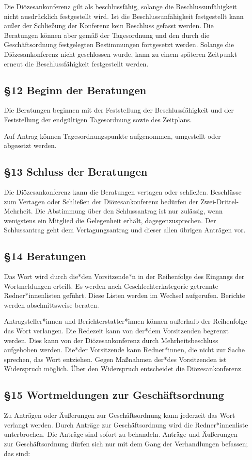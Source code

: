 \documentclass[12pt]{report}
\begin{document}
\begin{justify}
Die Diözesankonferenz gilt als beschlussfähig, solange die Beschlussunfähigkeit nicht ausdrücklich
festgestellt wird. Ist die Beschlussunfähigkeit festgestellt kann außer
der Schließung der Konferenz kein Beschluss gefasst werden. Die Beratungen können aber gemäß der Tagesordnung und den durch die Geschäftsordnung festgelegten Bestimmungen fortgesetzt werden. Solange die Diözesankonferenz nicht geschlossen wurde, kann zu einem späteren Zeitpunkt erneut die Beschlussfähigkeit festgestellt werden.

\subsection*{§12 Beginn der Beratungen}
Die Beratungen beginnen mit der Feststellung der Beschlussfähigkeit und der Feststellung der endgültigen
Tagesordnung sowie des Zeitplans.

Auf Antrag können Tagesordnungspunkte aufgenommen, umgestellt oder abgesetzt werden.
\subsection*{§13 Schluss der Beratungen}
Die Diözesankonferenz kann die Beratungen vertagen oder schließen. Beschlüsse zum Vertagen oder Schließen
der Diözesankonferenz bedürfen der Zwei-Drittel-Mehrheit. Die Abstimmung über den Schlussantrag ist
nur zulässig, wenn wenigstens ein Mitglied die Gelegenheit erhält, dagegenzusprechen. Der Schlussantrag
geht dem Vertagungsantrag und dieser allen übrigen Anträgen vor.
\subsection*{§14 Beratungen}
Das Wort wird durch die*den Vorsitzende*n in der Reihenfolge des Eingangs der Wortmeldungen erteilt.
Es werden nach Geschlechterkategorie getrennte Redner*innenlisten geführt. Diese Listen werden im Wechsel aufgerufen.
Berichte werden abschnittsweise beraten.

Antragsteller*innen und Berichterstatter*innen können außerhalb der Reihenfolge das Wort verlangen. Die Redezeit
kann von der*dem Vorsitzenden begrenzt werden. Dies kann von der Diözesankonferenz durch Mehrheitsbeschluss
aufgehoben werden. Die*der Vorsitzende kann Redner*innen, die nicht zur Sache sprechen, das
Wort entziehen. Gegen Maßnahmen der*des Vorsitzenden ist Widerspruch möglich. Über den Widerspruch
entscheidet die Diözesankonferenz.

\subsection*{§15 Wortmeldungen zur Geschäftsordnung}
Zu Anträgen oder Äußerungen zur Geschäftsordnung kann jederzeit das Wort verlangt werden.
Durch Anträge zur Geschäftsordnung wird die Redner*innenliste unterbrochen. Die Anträge sind sofort zu
behandeln. Anträge und Äußerungen zur Geschäftsordnung dürfen sich nur mit dem Gang der Verhandlungen
befassen; das sind:


\end{justify}
\end{document}
